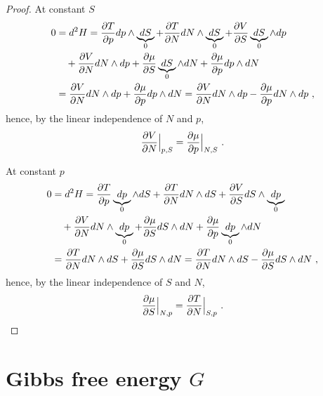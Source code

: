 \begin{proof}
        At constant $S$ 
        \begin{equation*}
        \begin{aligned}
            0 & = d^2 H = \frac{\partial T}{\partial p} dp \wedge \underbrace{dS}_0 + \frac{\partial T}{\partial N} dN \wedge \underbrace{dS}_0 + \frac{\partial V}{\partial S} \underbrace{dS}_0 \wedge dp \\ & \quad + \frac{\partial V}{\partial N} dN \wedge dp + \frac{\partial\mu}{\partial S} \underbrace{dS}_0 \wedge dN + \frac{\partial\mu}{\partial p} dp \wedge dN \\ & = \frac{\partial V}{\partial N} dN \wedge dp + \frac{\partial\mu}{\partial p} dp \wedge dN = \frac{\partial V}{\partial N} dN \wedge dp - \frac{\partial\mu}{\partial p} dN \wedge dp ~,
        \end{aligned}
        \end{equation*}
        hence, by the linear independence of $N$ and $p$,
        \begin{equation*}
            \frac{\partial V}{\partial N} \Big \vert_{p,S} = \frac{\partial\mu}{\partial p} \Big \vert_{N, S} ~.
        \end{equation*}

        At constant $p$ 
        \begin{equation*}
        \begin{aligned}
            0 & = d^2 H = \frac{\partial T}{\partial p} \underbrace{dp}_0 \wedge dS + \frac{\partial T}{\partial N} dN \wedge dS + \frac{\partial V}{\partial S} dS \wedge \underbrace{dp}_0 \\ & \quad + \frac{\partial V}{\partial N} dN \wedge \underbrace{dp}_0 + \frac{\partial\mu}{\partial S} dS \wedge dN + \frac{\partial\mu}{\partial p} \underbrace{dp}_0 \wedge dN \\ & = \frac{\partial T}{\partial N} dN \wedge dS + \frac{\partial\mu}{\partial S} dS \wedge dN = \frac{\partial T}{\partial N} dN \wedge dS - \frac{\partial\mu}{\partial S} dS \wedge dN ~,
        \end{aligned}
        \end{equation*}
        hence, by the linear independence of $S$ and $N$,
        \begin{equation*}
            \frac{\partial\mu}{\partial S} \Big \vert_{N,p} = \frac{\partial T}{\partial N} \Big \vert_{S, p} ~.
        \end{equation*}
    \end{proof}

\section{Gibbs free energy $G$} 

